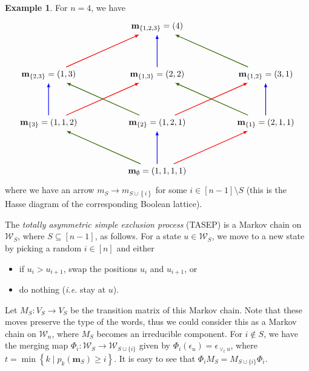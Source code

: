 \documentclass[reqno]{amsart}
\newcommand{\mbf}{\mathbf}
\newcommand{\0}{\phantom{c}}
\newcommand{\merge}[1]{\vee_{#1}} %
\newcommand{\mm}{\mathbf{m}}
\newcommand{\mcW}{\mathcal{W}}
\newcommand{\set}[1]{\left\{ #1 \right\}}
\newcommand{\defn}[1]{{\color{darkred}\emph{#1}}} %
\theoremstyle{plain}
\theoremstyle{definition}
\newtheorem{example}[thm]{Example}
\numberwithin{equation}{section}
\begin{document}
\begin{example}
  For $n = 4$, we have
  \[
  \begin{tikzpicture}[xscale=4.5,yscale=2,thick,>=latex]
  \node (E) at (1,0) {$\mbf{m}_{\emptyset} = (1,1,1,1)$};
  \node (1) at (2,1) {$\mbf{m}_{\{1\}} = (2,1,1)$};
  \node (2) at (1,1) {$\mbf{m}_{\{2\}} = (1,2,1)$};
  \node (3) at (0,1) {$\mbf{m}_{\{3\}} = (1,1,2)$};
  \node (12) at (2,2) {$\mbf{m}_{\{1,2\}} = (3,1)$};
  \node (13) at (1,2) {$\mbf{m}_{\{1,3\}} = (2,2)$};
  \node (23) at (0,2) {$\mbf{m}_{\{2,3\}} = (1,3)$};
  \node (123) at (1,3) {$\mbf{m}_{\{1,2,3\}} = (4)$};
  \draw[->,red] (E) -- (1);
  \draw[->,blue] (E) -- (2);
  \draw[->,dgreencolor] (E) -- (3);
  \draw[->,red] (2) -- (12);
  \draw[->,red] (3) -- (13);
  \draw[->,blue] (3) -- (23);
  \draw[->,blue] (1) -- (12);
  \draw[->,dgreencolor] (1) -- (13);
  \draw[->,dgreencolor] (2) -- (23);
  \draw[->,red] (23) -- (123);
  \draw[->,blue] (13) -- (123);
  \draw[->,dgreencolor] (12) -- (123);
  \end{tikzpicture}
  \]
  where we have an arrow $m_S \to m_{S \cup \set{i}}$ for some $i \in [n-1] \setminus S$ (this is the Hasse diagram of the corresponding Boolean lattice).
\end{example}

The \defn{totally asymmetric simple exclusion process} (TASEP) is a Markov chain on $\mcW_S$, where $S \subseteq[n-1]$, as follows.
For a state $u \in \mcW_S$, we move to a new state by picking a random $i \in [n]$ and either
\begin{itemize}
\item if $u_i > u_{i+1}$, swap the positions $u_i$ and $u_{i+1}$, or
\item do nothing (\textit{i.e.} stay at $u$).
\end{itemize}
Let $M_S \colon V_S \to V_S$ be the transition matrix of this Markov chain.
Note that these moves preserve the type of the words, thus we could consider this as a Markov chain on $\mcW_n$, where $M_S$ becomes an irreducible component.
For $i \notin S$, we have the merging map $\Phi_i \colon \mcW_S \to \mcW_{S\cup\{i\}}$ given by $\Phi_i(\epsilon_u) = \epsilon_{\merge{t}u}$, where $t = \min\set{k \mid p_k(\mm_S) \geq i}$.
It is easy to see that $\Phi_i M_S = M_{S\cup \{i\}} \Phi_i$. 
\end{document}
